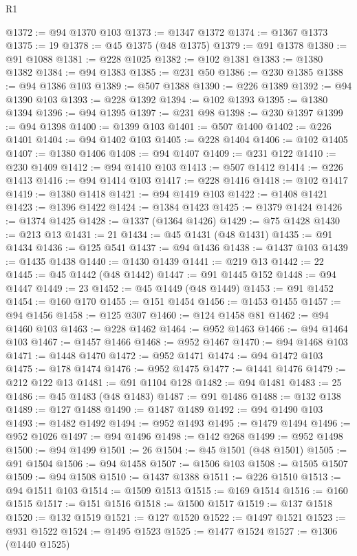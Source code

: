 \begin{lexlean}{R1}
\begin{coremodule}
@1372 := @94 @1370 @103
@1373 := @1347 @1372
@1374 := @1367 @1373
@1375 := 19
@1378 := @45 @1375 (@48 @1375)
@1379 := @91 @1378
@1380 := @91 @1088
@1381 := @228 @1025
@1382 := @102 @1381
@1383 := @1380 @1382
@1384 := @94 @1383
@1385 := @231 @50
@1386 := @230 @1385
@1388 := @94 @1386 @103
@1389 := @507 @1388
@1390 := @226 @1389
@1392 := @94 @1390 @103
@1393 := @228 @1392
@1394 := @102 @1393
@1395 := @1380 @1394
@1396 := @94 @1395
@1397 := @231 @98
@1398 := @230 @1397
@1399 := @94 @1398
@1400 := @1399 @103
@1401 := @507 @1400
@1402 := @226 @1401
@1404 := @94 @1402 @103
@1405 := @228 @1404
@1406 := @102 @1405
@1407 := @1380 @1406
@1408 := @94 @1407
@1409 := @231 @122
@1410 := @230 @1409
@1412 := @94 @1410 @103
@1413 := @507 @1412
@1414 := @226 @1413
@1416 := @94 @1414 @103
@1417 := @228 @1416
@1418 := @102 @1417
@1419 := @1380 @1418
@1421 := @94 @1419 @103
@1422 := @1408 @1421
@1423 := @1396 @1422
@1424 := @1384 @1423
@1425 := @1379 @1424
@1426 := @1374 @1425
@1428 := @1337 (@1364 @1426)
@1429 := @75 @1428
@1430 := @213 @13
@1431 := 21
@1434 := @45 @1431 (@48 @1431)
@1435 := @91 @1434
@1436 := @125 @541
@1437 := @94 @1436
@1438 := @1437 @103
@1439 := @1435 @1438
@1440 := @1430 @1439
@1441 := @219 @13
@1442 := 22
@1445 := @45 @1442 (@48 @1442)
@1447 := @91 @1445 @152
@1448 := @94 @1447
@1449 := 23
@1452 := @45 @1449 (@48 @1449)
@1453 := @91 @1452
@1454 := @160 @170
@1455 := @151 @1454
@1456 := @1453 @1455
@1457 := @94 @1456
@1458 := @125 @307
@1460 := @124 @1458 @81
@1462 := @94 @1460 @103
@1463 := @228 @1462
@1464 := @952 @1463
@1466 := @94 @1464 @103
@1467 := @1457 @1466
@1468 := @952 @1467
@1470 := @94 @1468 @103
@1471 := @1448 @1470
@1472 := @952 @1471
@1474 := @94 @1472 @103
@1475 := @178 @1474
@1476 := @952 @1475
@1477 := @1441 @1476
@1479 := @212 @122 @13
@1481 := @91 @1104 @128
@1482 := @94 @1481
@1483 := 25
@1486 := @45 @1483 (@48 @1483)
@1487 := @91 @1486
@1488 := @132 @138
@1489 := @127 @1488
@1490 := @1487 @1489
@1492 := @94 @1490 @103
@1493 := @1482 @1492
@1494 := @952 @1493
@1495 := @1479 @1494
@1496 := @952 @1026
@1497 := @94 @1496
@1498 := @142 @268
@1499 := @952 @1498
@1500 := @94 @1499
@1501 := 26
@1504 := @45 @1501 (@48 @1501)
@1505 := @91 @1504
@1506 := @94 @1458
@1507 := @1506 @103
@1508 := @1505 @1507
@1509 := @94 @1508
@1510 := @1437 @1388
@1511 := @226 @1510
@1513 := @94 @1511 @103
@1514 := @1509 @1513
@1515 := @169 @1514
@1516 := @160 @1515
@1517 := @151 @1516
@1518 := @1500 @1517
@1519 := @137 @1518
@1520 := @132 @1519
@1521 := @127 @1520
@1522 := @1497 @1521
@1523 := @931 @1522
@1524 := @1495 @1523
@1525 := @1477 @1524
@1527 := @1306 (@1440 @1525)

\end{coremodule}
\end{lexlean}
